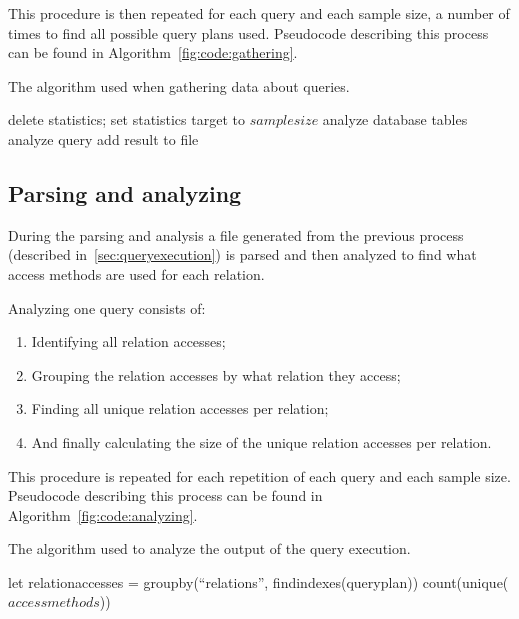 This procedure is then repeated for each query and each sample size, a number of
times to find all possible query plans used. Pseudocode describing this process
can be found in Algorithm~\ref{fig:code:gathering}.

\begin{algorithm}
\caption[Pseudocode for the data gathering]{The algorithm used when
  gathering data about queries.}\label{fig:code:gathering}
\begin{algorithmic}[1]
        \State delete statistics;
        \State set statistics target to $samplesize$
        \State analyze database tables
        \State analyze query
        \State add result to file
      \EndFor
    \EndFor
  \EndFor
\end{algorithmic}
\end{algorithm}

\subsection{Parsing and analyzing}\label{sec:parsing}
During the parsing and analysis a file generated from the previous process
(described in~\ref{sec:queryexecution}) is parsed and then analyzed to find what
access methods are used for each relation.

Analyzing one query consists of:
\begin{enumerate}
\item Identifying all relation accesses;
\item Grouping the relation accesses by what relation they access;
\item Finding all unique relation accesses per relation;
\item And finally calculating the size of the unique relation accesses per relation.
\end{enumerate}

This procedure is repeated for each repetition of each query and each sample
size. Pseudocode describing this process can be found in Algorithm~\ref{fig:code:analyzing}.

\begin{algorithm}
\caption[Pseudocode for the parsing and analyzing]{The algorithm used to analyze
the output of the query execution.}\label{fig:code:analyzing}
\begin{algorithmic}[1]
    \State let relationaccesses = groupby(``relations'', findindexes(queryplan))
      \State count(unique($accessmethods$))
    \EndFor
  \EndFor
\end{algorithmic}
\end{algorithm}

